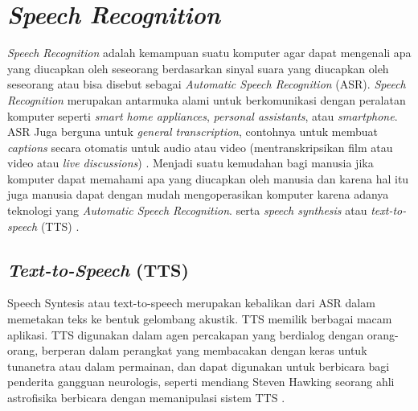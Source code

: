 \newpage
\section{\textit{Speech Recognition}}
\textit{Speech Recognition} adalah kemampuan suatu komputer agar dapat mengenali apa yang diucapkan oleh seseorang berdasarkan sinyal suara yang diucapkan oleh seseorang atau bisa disebut sebagai \textit{Automatic Speech Recognition} (ASR)\citep{jurafskyspeech2008}. \textit{Speech Recognition} merupakan antarmuka alami untuk berkomunikasi dengan peralatan komputer seperti \textit{smart home appliances}, \textit{personal assistants}, atau \textit{smartphone}. ASR Juga berguna untuk \textit{general transcription}, contohnya untuk membuat \textit{captions} secara otomatis untuk audio atau video (mentranskripsikan film atau video atau \textit{live discussions}) \citep{jurafskyspeech2008}. Menjadi suatu kemudahan bagi manusia jika komputer dapat memahami apa yang diucapkan oleh manusia dan karena hal itu juga manusia dapat dengan mudah mengoperasikan komputer karena adanya teknologi yang \textit{Automatic Speech Recognition}. serta \textit{speech synthesis} atau \textit{text-to-speech} (TTS) \citep{jurafskyspeech2008}.

\subsection{\textit{Text-to-Speech }(TTS)}
Speech Syntesis atau text-to-speech merupakan kebalikan dari ASR dalam memetakan teks ke bentuk gelombang akustik. TTS memilik berbagai macam aplikasi. TTS digunakan dalam agen percakapan yang berdialog dengan orang-orang, berperan dalam perangkat yang membacakan dengan keras untuk tunanetra atau dalam permainan, dan dapat digunakan untuk berbicara bagi penderita gangguan neurologis, seperti mendiang Steven Hawking seorang ahli astrofisika berbicara dengan memanipulasi sistem TTS \citep{jurafskyspeech2008}.



